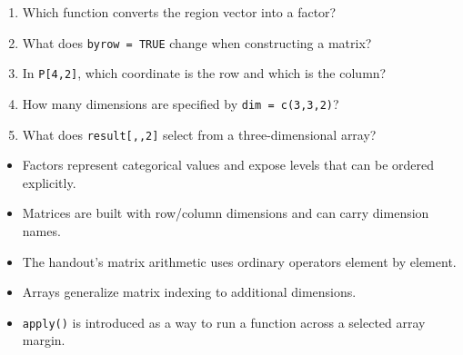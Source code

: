 \begin{quickcheck}
\begin{enumerate}
  \item Which function converts the region vector into a factor?
  \item What does \texttt{byrow = TRUE} change when constructing a matrix?
  \item In \texttt{P[4,2]}, which coordinate is the row and which is the column?
  \item How many dimensions are specified by \texttt{dim = c(3,3,2)}?
  \item What does \texttt{result[,,2]} select from a three-dimensional array?
\end{enumerate}
\end{quickcheck}

\begin{chapterrecap}
\begin{itemize}
  \item Factors represent categorical values and expose levels that can be ordered explicitly.
  \item Matrices are built with row/column dimensions and can carry dimension names.
  \item The handout's matrix arithmetic uses ordinary operators element by element.
  \item Arrays generalize matrix indexing to additional dimensions.
  \item \texttt{apply()} is introduced as a way to run a function across a selected array margin.
\end{itemize}
\end{chapterrecap}
